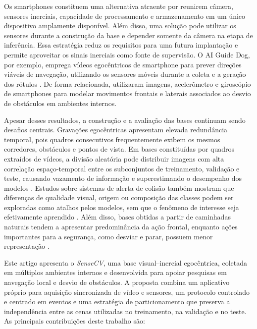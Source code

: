 \documentclass[conference]{IEEEtran}
\newcommand{\sensecv}{\textit{SenseCV}}
\begin{document}
Os smartphones constituem uma alternativa atraente por reunirem câmera, sensores inerciais, capacidade de processamento e armazenamento em um único dispositivo amplamente disponível. Além disso, uma solução pode utilizar os sensores durante a construção da base e depender somente da câmera na etapa de inferência. Essa estratégia reduz os requisitos para uma futura implantação e permite aproveitar os sinais inerciais como fonte de supervisão. O AI Guide Dog, por exemplo, emprega vídeos egocêntricos de smartphone para prever direções viáveis de navegação, utilizando os sensores móveis durante a coleta e a geração dos rótulos \cite{jadhav2025}. De forma relacionada, \cite{medeiros2021} utilizaram imagens, acelerômetro e giroscópio de smartphones para modelar movimentos frontais e laterais associados ao desvio de obstáculos em ambientes internos.

Apesar desses resultados, a construção e a avaliação das bases continuam sendo desafios centrais. Gravações egocêntricas apresentam elevada redundância temporal, pois quadros consecutivos frequentemente exibem os mesmos corredores, obstáculos e pontos de vista. Em bases constituídas por quadros extraídos de vídeos, a divisão aleatória pode distribuir imagens com alta correlação espaço-temporal entre os subconjuntos de treinamento, validação e teste, causando vazamento de informação e superestimando o desempenho dos modelos \cite{figueiredo2024leakage}. Estudos sobre sistemas de alerta de colisão também mostram que diferenças de qualidade visual, origem ou composição das classes podem ser exploradas como atalhos pelos modelos, sem que o fenômeno de interesse seja efetivamente aprendido \cite{chitraranjan2025}. Além disso, bases obtidas a partir de caminhadas naturais tendem a apresentar predominância da ação frontal, enquanto ações importantes para a segurança, como desviar e parar, possuem menor representação \cite{jadhav2025}.

Este artigo apresenta o \sensecv{}, uma base visual--inercial egocêntrica, coletada em múltiplos ambientes internos e desenvolvida para apoiar pesquisas em navegação local e desvio de obstáculos. A proposta combina um aplicativo próprio para aquisição sincronizada de vídeo e sensores, um protocolo controlado e centrado em eventos e uma estratégia de particionamento que preserva a independência entre as cenas utilizadas no treinamento, na validação e no teste. As principais contribuições deste trabalho são:
\end{document}
